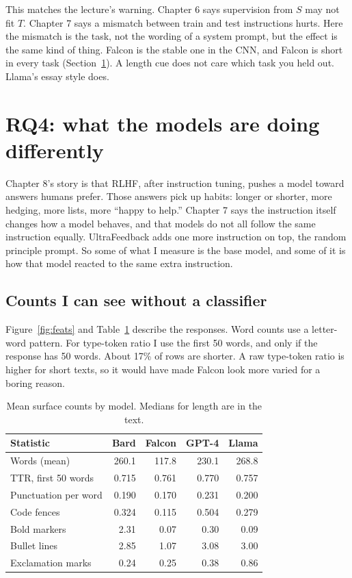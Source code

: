 \documentclass[11pt]{article}
\begin{document}
This matches the lecture's warning. Chapter 6 says supervision from $S$ may not fit $T$. Chapter 7 says a mismatch between train and test instructions hurts. Here the mismatch is the task, not the wording of a system prompt, but the effect is the same kind of thing. Falcon is the stable one in the CNN, and Falcon is short in every task (Section~\ref{sec:rq4}). A length cue does not care which task you held out. Llama's essay style does.

\section{RQ4: what the models are doing differently}
\label{sec:rq4}

Chapter 8's story is that RLHF, after instruction tuning, pushes a model toward answers humans prefer. Those answers pick up habits: longer or shorter, more hedging, more lists, more ``happy to help.'' Chapter 7 says the instruction itself changes how a model behaves, and that models do not all follow the same instruction equally. UltraFeedback adds one more instruction on top, the random principle prompt. So some of what I measure is the base model, and some of it is how that model reacted to the same extra instruction.

\subsection{Counts I can see without a classifier}

Figure~\ref{fig:feats} and Table~\ref{tab:feats} describe the responses. Word counts use a letter-word pattern. For type-token ratio I use the first 50 words, and only if the response has 50 words. About 17\% of rows are shorter. A raw type-token ratio is higher for short texts, so it would have made Falcon look more varied for a boring reason.

\begin{table}[H]
\centering
\caption{Mean surface counts by model. Medians for length are in the text.}
\label{tab:feats}
\small
\begin{tabular}{lrrrr}
\toprule
Statistic & Bard & Falcon & GPT-4 & Llama \\
\midrule
Words (mean) & 260.1 & 117.8 & 230.1 & 268.8 \\
TTR, first 50 words & 0.715 & 0.761 & 0.770 & 0.757 \\
Punctuation per word & 0.190 & 0.170 & 0.231 & 0.200 \\
Code fences & 0.324 & 0.115 & 0.504 & 0.279 \\
Bold markers & 2.31 & 0.07 & 0.30 & 0.09 \\
Bullet lines & 2.85 & 1.07 & 3.08 & 3.00 \\
Exclamation marks & 0.24 & 0.25 & 0.38 & 0.86 \\
\bottomrule
\end{tabular}
\end{table}
\end{document}
